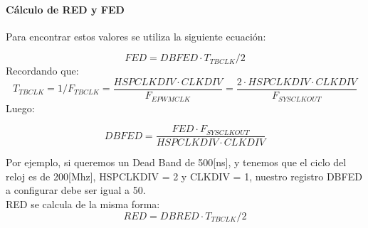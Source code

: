 \paragraph{Cálculo de RED y FED}
\hfill \break \par
Para encontrar estos valores se utiliza la siguiente ecuación:

$$FED = DBFED\cdot T_{TBCLK}/2 $$
Recordando que:
$$T_{TBCLK} = 1/F_{TBCLK} = \frac{HSPCLKDIV \cdot CLKDIV}{F_{EPWMCLK}} = \frac{2 \cdot HSPCLKDIV \cdot CLKDIV}{F_{SYSCLKOUT}}$$
Luego:

$$DBFED = \frac{FED \cdot F_{SYSCLKOUT}}{HSPCLKDIV \cdot CLKDIV}$$

Por ejemplo, si queremos un Dead Band de 500[ns], y tenemos que el ciclo del reloj es de 200[Mhz], HSPCLKDIV = 2 y CLKDIV = 1, nuestro registro DBFED a configurar debe ser igual a 50.\\
RED se calcula de la misma forma:
$$RED = DBRED \cdot T_{TBCLK}/2$$
